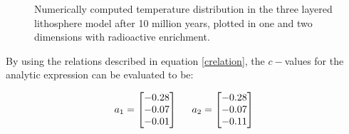 \documentclass[10pt,a4paper]{article}
\begin{document}
\begin{figure} [H]
	\centering
	\caption{\label{10enriched}Numerically computed temperature distribution in the three layered lithosphere model after 10 million years, plotted in one and two dimensions with radioactive enrichment. }
\end{figure}


\noindent By using the relations described in equation \ref{crelation}, the $c-$values for the analytic expression can be evaluated to be:

\begin{equation}
a_1=\begin{bmatrix}
-0.28\\
-0.07\\
-0.01\\
\end{bmatrix}\\
\hspace{0.5cm}
a_2=\begin{bmatrix}
-0.28\\
-0.07\\
-0.11\\
\end{bmatrix}\\
\vspace{0.5cm}
\end{equation}
\end{document}
